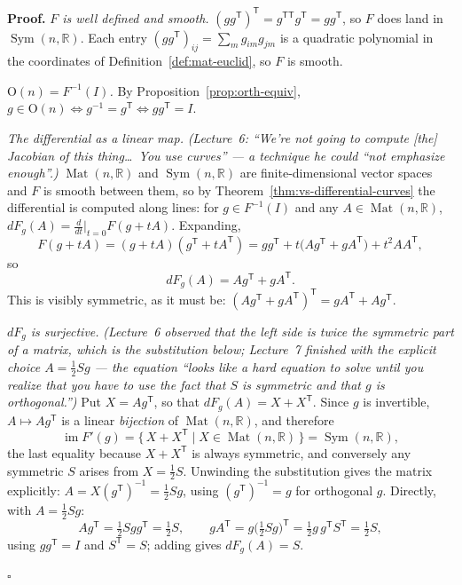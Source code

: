\documentclass[11pt]{report}
\renewenvironment{proof}[1][Proof]{\noindent\textbf{#1.} }{\hfill$\square$\par\vspace{5pt}}
\newcommand{\Ogp}{\mathrm{O}}
\DeclareMathOperator{\Mat}{Mat}
\DeclareMathOperator{\Sym}{Sym}
\begin{document}
\begin{proof}
\emph{$F$ is well defined and smooth.} $(gg^{\mathsf T})^{\mathsf T} = g^{\mathsf T\mathsf T} g^{\mathsf T} = g g^{\mathsf T}$, so $F$ does land in $\Sym(n,\mathbb{R})$. Each entry $(gg^{\mathsf T})_{ij} = \sum_m g_{im}g_{jm}$ is a quadratic polynomial in the coordinates of Definition~\ref{def:mat-euclid}, so $F$ is smooth.

\emph{$\Ogp(n) = F^{-1}(I)$.} By Proposition~\ref{prop:orth-equiv}, $g \in \Ogp(n) \iff g^{-1} = g^{\mathsf T} \iff gg^{\mathsf T} = I$.

\emph{The differential as a linear map.} \textit{(Lecture~6: ``We're not going to compute [the] Jacobian of this thing\ldots\ You use curves'' --- a technique he could ``not emphasize enough''.)} $\Mat(n,\mathbb{R})$ and $\Sym(n,\mathbb{R})$ are finite-dimensional vector spaces and $F$ is smooth between them, so by Theorem~\ref{thm:vs-differential-curves} the differential is computed along lines: for $g \in F^{-1}(I)$ and any $A \in \Mat(n,\mathbb{R})$, $dF_g(A) = \frac{d}{dt}\big|_{t=0} F(g+tA)$. Expanding,
\[
F(g+tA) = (g+tA)(g^{\mathsf T} + tA^{\mathsf T}) = g g^{\mathsf T} + t\big(A g^{\mathsf T} + g A^{\mathsf T}\big) + t^2 A A^{\mathsf T},
\]
so
\[
dF_g(A) = A g^{\mathsf T} + g A^{\mathsf T}.
\]
This is visibly symmetric, as it must be: $(Ag^{\mathsf T} + gA^{\mathsf T})^{\mathsf T} = gA^{\mathsf T} + Ag^{\mathsf T}$.

\emph{$dF_g$ is surjective.} \textit{(Lecture~6 observed that the left side is twice the symmetric part of a matrix, which is the substitution below; Lecture~7 finished with the explicit choice $A = \tfrac12 Sg$ --- the equation ``looks like a hard equation to solve until you realize that you have to use the fact that $S$ is symmetric and that $g$ is orthogonal.'')} Put $X = Ag^{\mathsf T}$, so that $dF_g(A) = X + X^{\mathsf T}$. Since $g$ is invertible, $A \mapsto Ag^{\mathsf T}$ is a linear \emph{bijection} of $\Mat(n,\mathbb{R})$, and therefore
\[
\operatorname{im} F'(g) = \{\, X + X^{\mathsf T} \mid X \in \Mat(n,\mathbb{R}) \,\} = \Sym(n,\mathbb{R}),
\]
the last equality because $X + X^{\mathsf T}$ is always symmetric, and conversely any symmetric $S$ arises from $X = \tfrac12 S$. Unwinding the substitution gives the matrix explicitly: $A = X (g^{\mathsf T})^{-1} = \tfrac12 S g$, using $(g^{\mathsf T})^{-1} = g$ for orthogonal $g$. Directly, with $A = \tfrac12 Sg$:
\[
A g^{\mathsf T} = \tfrac12 S g g^{\mathsf T} = \tfrac12 S, \qquad
g A^{\mathsf T} = g \big(\tfrac12 S g\big)^{\mathsf T} = \tfrac12 g\, g^{\mathsf T} S^{\mathsf T} = \tfrac12 S,
\]
using $gg^{\mathsf T} = I$ and $S^{\mathsf T} = S$; adding gives $dF_g(A) = S$.


\end{proof}
\end{document}
